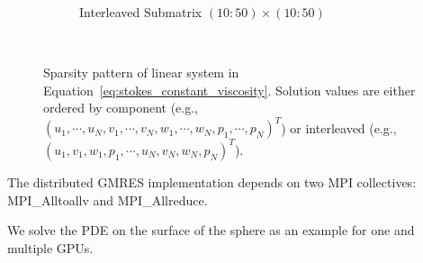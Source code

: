 \begin{figure}
\begin{subfigure}[b]{0.4\textwidth}
		\caption{Interleaved Submatrix $(10:50) \times (10:50)$}
		\label{fig:interleaved_stokes_zoom_dm}
	\end{subfigure} \\
\caption{Sparsity pattern of linear system in Equation~\ref{eq:stokes_constant_viscosity}. Solution values are either ordered by component (e.g., $( u_1, \cdots, u_N, v_1, \cdots, v_N, w_1, \cdots, w_N, p_1, \cdots, p_N)^T$) or interleaved (e.g., $( u_1, v_1, w_1, p_1,\cdots, u_N, v_N, w_N, p_N)^T$). }
\label{fig:interleaved_solution}
\end{figure} 


The distributed GMRES implementation depends on two MPI collectives: MPI\_Alltoallv and MPI\_Allreduce. 



We solve the PDE on the surface of the sphere as an example for one and multiple GPUs. 





